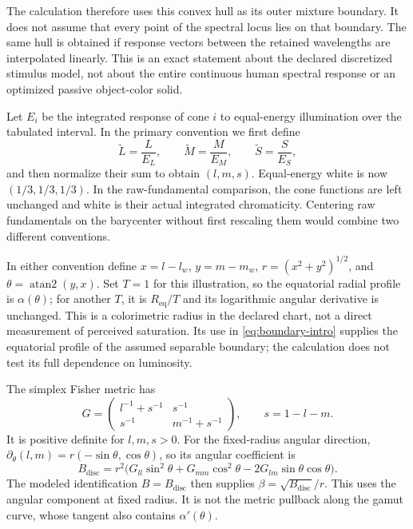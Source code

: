 \documentclass[9pt,twocolumn,twoside]{opticajnl}
\theoremstyle{plain}
\begin{document}
The calculation therefore uses this convex hull as its outer mixture boundary. It does not assume that every point of the spectral locus lies on that boundary. The same hull is obtained if response vectors between the retained wavelengths are interpolated linearly. This is an exact statement about the declared discretized stimulus model, not about the entire continuous human spectral response or an optimized passive object-color solid.

Let $E_i$ be the integrated response of cone $i$ to equal-energy illumination over the tabulated interval. In the primary convention we first define
\begin{equation}
 \widetilde L=\frac{L}{E_L},\qquad
 \widetilde M=\frac{M}{E_M},\qquad
 \widetilde S=\frac{S}{E_S},
 \label{eq:white-balance}
\end{equation}
and then normalize their sum to obtain $(l,m,s)$. Equal-energy white is now $(1/3,1/3,1/3)$. In the raw-fundamental comparison, the cone functions are left unchanged and white is their actual integrated chromaticity. Centering raw fundamentals on the barycenter without first rescaling them would combine two different conventions.

In either convention define $x=l-l_w$, $y=m-m_w$, $r=(x^2+y^2)^{1/2}$, and $\theta=\operatorname{atan2}(y,x)$. Set $T=1$ for this illustration, so the equatorial radial profile is $\alpha(\theta)$; for another $T$, it is $R_{\mathrm{eq}}/T$ and its logarithmic angular derivative is unchanged. This is a colorimetric radius in the declared chart, not a direct measurement of perceived saturation. Its use in \eqref{eq:boundary-intro} supplies the equatorial profile of the assumed separable boundary; the calculation does not test its full dependence on luminosity.

The simplex Fisher metric \cite{Rao1945,Amari2016} has
\begin{equation}
 G=\begin{pmatrix}l^{-1}+s^{-1}&s^{-1}\\s^{-1}&m^{-1}+s^{-1}\end{pmatrix},
 \qquad s=1-l-m.
 \label{eq:fisher}
\end{equation}
It is positive definite for $l,m,s>0$. For the fixed-radius angular direction, $\partial_\theta(l,m)=r(-\sin\theta,\cos\theta)$, so its angular coefficient is
\begin{equation}
 B_{\mathrm{disc}}=r^2\bigl(G_{ll}\sin^2\theta+G_{mm}\cos^2\theta
                    -2G_{lm}\sin\theta\cos\theta\bigr).
 \label{eq:angular-fisher}
\end{equation}
The modeled identification $B=B_{\mathrm{disc}}$ then supplies $\beta=\sqrt{B_{\mathrm{disc}}}/r$. This uses the angular component at fixed radius. It is not the metric pullback along the gamut curve, whose tangent also contains $\alpha'(\theta)$.
\end{document}
